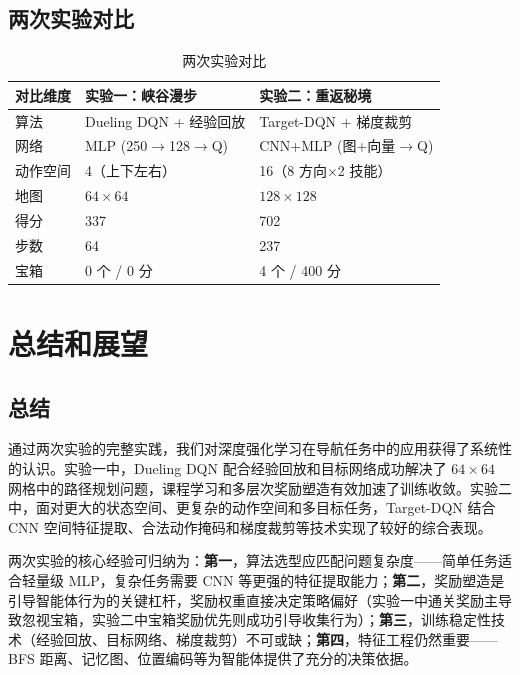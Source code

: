\documentclass[12pt,a4paper]{article}
\begin{document}
\subsection{两次实验对比}

\begin{table}[htbp]
\centering
\caption{两次实验对比}\label{tab:compare}
\begin{tabularx}{\textwidth}{lXX}
\toprule
\textbf{对比维度} & \textbf{实验一：峡谷漫步} & \textbf{实验二：重返秘境} \\
\midrule
算法     & Dueling DQN + 经验回放         & Target-DQN + 梯度裁剪 \\
网络     & MLP (250$\to$128$\to$Q)        & CNN+MLP (图+向量$\to$Q) \\
动作空间 & 4（上下左右）                   & 16（8 方向$\times$2 技能） \\
地图     & $64\times64$                    & $128\times128$ \\
得分     & 337                             & 702 \\
步数     & 64                              & 237 \\
宝箱     & 0 个 / 0 分                     & 4 个 / 400 分 \\
\bottomrule
\end{tabularx}
\end{table}

\section{总结和展望}

\subsection{总结}

通过两次实验的完整实践，我们对深度强化学习在导航任务中的应用获得了系统性的认识。实验一中，Dueling DQN 配合经验回放和目标网络成功解决了 $64\times64$ 网格中的路径规划问题，课程学习和多层次奖励塑造有效加速了训练收敛。实验二中，面对更大的状态空间、更复杂的动作空间和多目标任务，Target-DQN 结合 CNN 空间特征提取、合法动作掩码和梯度裁剪等技术实现了较好的综合表现。

两次实验的核心经验可归纳为：\textbf{第一}，算法选型应匹配问题复杂度——简单任务适合轻量级 MLP，复杂任务需要 CNN 等更强的特征提取能力；\textbf{第二}，奖励塑造是引导智能体行为的关键杠杆，奖励权重直接决定策略偏好（实验一中通关奖励主导致忽视宝箱，实验二中宝箱奖励优先则成功引导收集行为）；\textbf{第三}，训练稳定性技术（经验回放、目标网络、梯度裁剪）不可或缺；\textbf{第四}，特征工程仍然重要——BFS 距离、记忆图、位置编码等为智能体提供了充分的决策依据。
\end{document}
